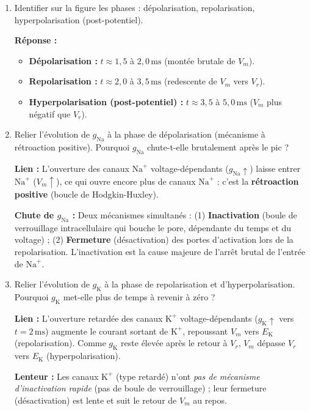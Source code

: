 \documentclass[11pt]{article}
\begin{document}
\begin{exercice}
\begin{enumerate}
\item Identifier sur la figure les phases : dépolarisation, repolarisation, hyperpolarisation (post-potentiel).
\par \textbf{Réponse :} 
\begin{itemize}
\item \textbf{Dépolarisation :} $t \approx 1,5$ à $2,0\,\text{ms}$ (montée brutale de $V_m$).
\item \textbf{Repolarisation :} $t \approx 2,0$ à $3,5\,\text{ms}$ (redescente de $V_m$ vers $V_r$).
\item \textbf{Hyperpolarisation (post-potentiel) :} $t \approx 3,5$ à $5,0\,\text{ms}$ ($V_m$ plus négatif que $V_r$).
\end{itemize}
\item Relier l'évolution de $g_{\text{Na}}$ à la phase de dépolarisation (mécanisme à rétroaction positive). Pourquoi $g_{\text{Na}}$ chute-t-elle brutalement après le pic ?
\par \textbf{Lien :} L'ouverture des canaux $\text{Na}^+$ voltage-dépendants ($g_{\text{Na}} \uparrow$) laisse entrer $\text{Na}^+$ ($V_m \uparrow$), ce qui ouvre encore plus de canaux $\text{Na}^+$ : c'est la \textbf{rétroaction positive} (boucle de Hodgkin-Huxley).
\par \textbf{Chute de $g_{\text{Na}}$ :} Deux mécanismes simultanés : (1) \textbf{Inactivation} (boule de verrouillage intracellulaire qui bouche le pore, dépendante du temps et du voltage) ; (2) \textbf{Fermeture} (désactivation) des portes d'activation lors de la repolarisation. L'inactivation est la cause majeure de l'arrêt brutal de l'entrée de $\text{Na}^+$.
\item Relier l'évolution de $g_{\text{K}}$ à la phase de repolarisation et d'hyperpolarisation. Pourquoi $g_{\text{K}}$ met-elle plus de temps à revenir à zéro ?
\par \textbf{Lien :} L'ouverture retardée des canaux $\text{K}^+$ voltage-dépendants ($g_{\text{K}} \uparrow$ vers $t=2\,\text{ms}$) augmente le courant sortant de $\text{K}^+$, repoussant $V_m$ vers $E_{\text{K}}$ (repolarisation). Comme $g_{\text{K}}$ reste élevée après le retour à $V_r$, $V_m$ dépasse $V_r$ vers $E_{\text{K}}$ (hyperpolarisation).
\par \textbf{Lenteur :} Les canaux $\text{K}^+$ (type retardé) n'ont \emph{pas de mécanisme d'inactivation rapide} (pas de boule de verrouillage) ; leur fermeture (désactivation) est lente et suit le retour de $V_m$ au repos.

\end{enumerate}
\end{exercice}
\end{document}
